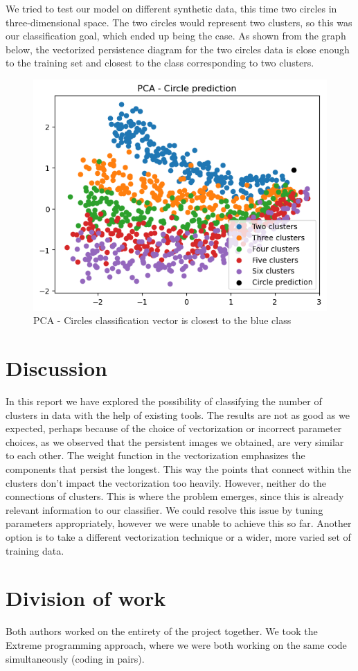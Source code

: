 \documentclass{article}
\begin{document}
We tried to test our model on different synthetic data, this time two circles in three-dimensional space. The two circles would represent two clusters, so this was our classification goal, which ended up being the case. As shown from the graph below, the vectorized persistence diagram for the two circles data is close enough to the training set and closest to the class corresponding to two clusters.

\begin{figure}[H]
    \centering
    \includegraphics[width=0.5\linewidth]{PCACircles.png}
    \caption{PCA - Circles classification vector is closest to the blue class}
\end{figure}

\section{Discussion}
In this report we have explored the possibility of classifying the number of clusters in data with the help of existing tools. The results are not as good as we expected, perhaps because of the choice of vectorization or incorrect parameter choices, as we observed that the persistent images we obtained, are very similar to each other. The weight function in the vectorization emphasizes the components that persist the longest. This way the points that connect within the clusters don't impact the vectorization too heavily. However, neither do the connections of clusters. This is where the problem emerges, since this is already relevant information to our classifier. We could resolve this issue by tuning parameters appropriately, however we were unable to achieve this so far. Another option is to take a different vectorization technique or a wider, more varied set of training data.

\section{Division of work}
Both authors worked on the entirety of the project together. We took the Extreme programming approach, where we were both working on the same code simultaneously (coding in pairs).




\end{document}
